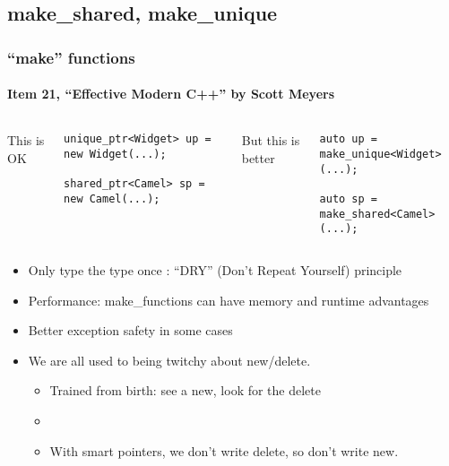 \subsection{make\_shared, make\_unique}
\begin{frame}[fragile]
\frametitle{``make'' functions}
\framesubtitle{Item 21, ``Effective Modern C++'' by Scott Meyers}
\begin{columns}[t]
This is OK
{\scriptsize\begin{verbatim}
unique_ptr<Widget> up = new Widget(...);

shared_ptr<Camel> sp = new Camel(...);
\end{verbatim}}
\pause{}
But this is better
{\scriptsize\begin{verbatim}
auto up = make_unique<Widget>(...);

auto sp = make_shared<Camel>(...);
\end{verbatim}}
\end{columns}
\vskip 12pt
\pause{}
\begin{itemize}
\item Only type the type once : ``DRY'' (Don't Repeat Yourself) principle
\vskip 6pt
\item Performance: make\_functions can have memory and runtime advantages
\item Better exception safety in some cases
\vskip 6pt
\item We are all used to being twitchy about new/delete.  
\begin{itemize}
  \item Trained from birth: see a new, look for the delete
  \item {}
  \item With smart pointers, we don't write delete, so don't write new.
  \end{itemize}
\end{itemize}
\pause{}

\end{frame}

